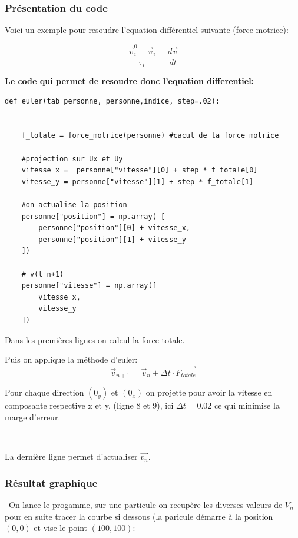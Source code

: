 \documentclass[a4paper,12pt]{article}
\begin{document}
\subsubsection{Présentation du code}

Voici un exemple pour resoudre l'equation différentiel suivante (force motrice):

\begin{equation}
\frac{\vec{v}_i^0 - \vec{v}_i}{\tau_i} = \frac{d\vec{v}}{dt}
\end{equation}

\newpage

\textbf{Le code qui permet de resoudre donc l'equation differentiel:}

\begin{verbatim}
def euler(tab_personne, personne,indice, step=.02):

    
    f_totale = force_motrice(personne) #cacul de la force motrice

    #projection sur Ux et Uy
    vitesse_x =  personne["vitesse"][0] + step * f_totale[0]
    vitesse_y = personne["vitesse"][1] + step * f_totale[1]
    
    #on actualise la position
    personne["position"] = np.array( [
        personne["position"][0] + vitesse_x,
        personne["position"][1] + vitesse_y 
    ])

    # v(t_n+1)
    personne["vitesse"] = np.array([
        vitesse_x,
        vitesse_y
    ])
\end{verbatim}

\noindent Dans les premières lignes on calcul la force totale.

\noindent Puis on applique la méthode d'euler:
\begin{equation}
    \vec{v}_{n+1} = \vec{v}_n + \Delta t \cdot \vec{F_{totale}}
\end{equation}

\noindent Pour chaque direction $(0_y)$ et $(0_x)$ on projette pour avoir la vitesse en composante respective x et y. (ligne 8 et 9), ici $\Delta t = 0.02$ ce qui minimise la marge d'erreur.

\

\noindent La dernière ligne permet d'actualiser $\vec{v_n}$.

\subsubsection{Résultat graphique}
\
On lance le progamme, sur une particule on recupère les diverses valeurs de $V_n$ pour en suite tracer la courbe si dessous (la paricule démarre à la position $(0,0)$ et vise le point $(100,100)$:
\end{document}
